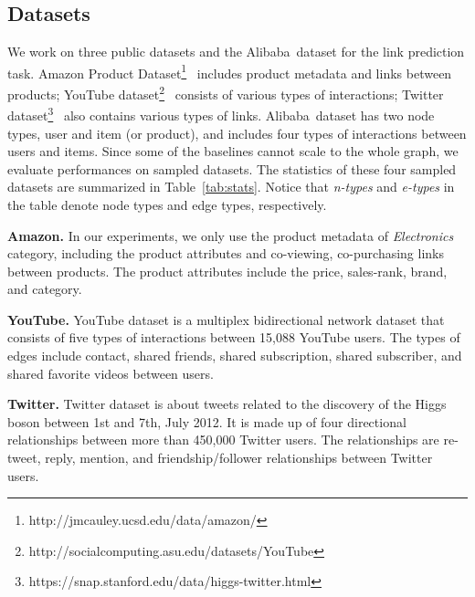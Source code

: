 \documentclass[sigconf]{acmart}
\newcommand{\company}{Alibaba}
\newcommand{\hide}[1]{} \newcommand{\jie}[1]{\textbf{\color{red}[(JT: #1 )]}}  \newcommand{\vpara}[1]{\vspace{0.07in}\noindent\textbf{#1 }}
\begin{document}
\subsection{Datasets}
We work on three public datasets and the \company\ dataset for the link prediction task. Amazon Product Dataset\footnote{http://jmcauley.ucsd.edu/data/amazon/}~\cite{mcauley2015image, he2016ups} includes product metadata and links between products; YouTube dataset\footnote{http://socialcomputing.asu.edu/datasets/YouTube}~\cite{tang2009uncoverning, tang2009uncovering}  consists of various types of interactions;  Twitter dataset\footnote{https://snap.stanford.edu/data/higgs-twitter.html}~\cite{de2013anatomy}  also contains various types of links. \company\ dataset has two node types, user and item (or product), and includes four types of interactions between users and items. Since some of the baselines cannot scale to the whole graph, we evaluate performances on sampled datasets. The statistics of these four sampled datasets are summarized in Table~\ref{tab:stats}. Notice that \textit{n-types} and \textit{e-types} in the table denote node types and edge types, respectively. 

\vpara{Amazon.} 
In our experiments, we only use the product metadata of \textit{Electronics} category, including the product attributes and co-viewing, co-purchasing links between products. The product attributes include the price, sales-rank, brand, and category. \hide{The node type set of Amazon is  and the edge type set of Amazon is , denoting that two products are co-bought or co-viewed by the same user respectively. The number of products in \textit{Electronics} is still large for many baselines; therefore, we extract a connected subgraph from the whole graph. }

\vpara{YouTube.} 
YouTube dataset is a multiplex bidirectional network dataset that consists of five types of interactions between 15,088 YouTube users. The types of edges include contact, shared friends, shared subscription, shared subscriber, and shared favorite videos between users. \hide{The size of node type set and edge type set of YouTube dataset is  and  respectively.}

\vpara{Twitter.} 
Twitter dataset is about tweets related to the discovery of the Higgs boson between 1st and 7th, July 2012. It is made up of four directional relationships between more than 450,000 Twitter users. The relationships are re-tweet, reply, mention, and friendship/follower relationships between Twitter users. \hide{The size of node type set and edge type set of Twitter dataset is  and  respectively.}
\end{document}
